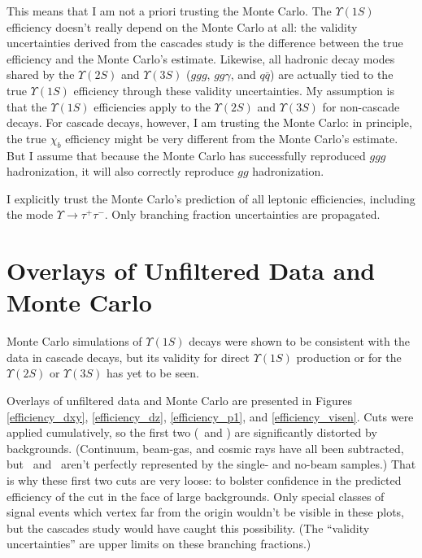 This means that I am not a priori trusting the Monte Carlo.  The
$\Upsilon(1S)$ efficiency doesn't really depend on the Monte Carlo at
all: the validity uncertainties derived from the cascades study is the
difference between the true efficiency and the Monte Carlo's estimate.
Likewise, all hadronic decay modes shared by the $\Upsilon(2S)$ and
$\Upsilon(3S)$ ($ggg$, $gg\gamma$, and $q\bar{q}$) are actually tied
to the true $\Upsilon(1S)$ efficiency through these validity
uncertainties.  My assumption is that the $\Upsilon(1S)$ efficiencies
apply to the $\Upsilon(2S)$ and $\Upsilon(3S)$ for non-cascade decays.
For cascade decays, however, I am trusting the Monte Carlo: in
principle, the true $\chi_b$ efficiency might be very different from
the Monte Carlo's estimate.  But I assume that because the Monte Carlo
has successfully reproduced $ggg$ hadronization, it will also
correctly reproduce $gg$ hadronization.

I explicitly trust the Monte Carlo's prediction of all leptonic
efficiencies, including the mode $\Upsilon \to \tau^+\tau^-$.  Only
branching fraction uncertainties are propagated.
 
\section{Overlays of Unfiltered Data and Monte Carlo}

Monte Carlo simulations of $\Upsilon(1S)$ decays were shown to be
consistent with the data in cascade decays, but its validity for
direct $\Upsilon(1S)$ production or for the $\Upsilon(2S)$ or
$\Upsilon(3S)$ has yet to be seen.

Overlays of unfiltered data and Monte Carlo are presented in Figures
\ref{efficiency_dxy}, \ref{efficiency_dz}, \ref{efficiency_p1}, and
\ref{efficiency_visen}.  Cuts were applied cumulatively, so the first
two (\dxy\ and \dz) are significantly distorted by backgrounds.
(Continuum, beam-gas, and cosmic rays have all been subtracted, but
\dxy\ and \dz\ aren't perfectly represented by the single- and no-beam
samples.)  That is why these first two cuts are very loose: to bolster
confidence in the predicted efficiency of the cut in the face of large
backgrounds.  Only special classes of signal events which vertex far
from the origin wouldn't be visible in these plots, but the cascades
study would have caught this possibility.  (The ``validity
uncertainties'' are upper limits on these branching fractions.)

